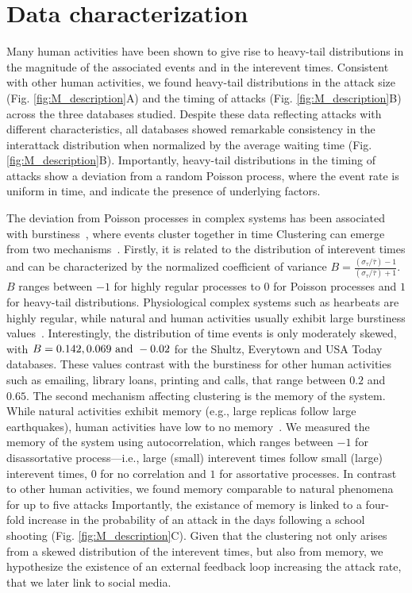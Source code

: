 \section*{Data characterization}
Many human activities have been shown to give rise to heavy-tail
distributions in the magnitude of the associated events and in the
interevent times.  Consistent with other human activities, we found
heavy-tail distributions in the attack size
(Fig. \ref{fig:M_description}A) and the timing of attacks
(Fig. \ref{fig:M_description}B) across the three databases studied.
Despite these data reflecting attacks with different characteristics,
all databases showed remarkable consistency in the interattack
distribution when normalized by the average waiting time
(Fig. \ref{fig:M_description}B).  Importantly, heavy-tail
distributions in the timing of attacks show a deviation from a random
Poisson process, where the event rate is uniform in time, and indicate
the presence of underlying factors.

The deviation from Poisson processes in complex systems has been
associated with burstiness~\cite{goh2008burstiness}, where events
cluster together in time
Clustering can emerge from two mechanisms~\cite{goh2008burstiness}.
Firstly, it is related to the distribution of interevent times and can
be characterized by the normalized coefficient of variance $B =
\frac{(\sigma_{\tau}/\bar{\tau}) - 1}{(\sigma_{\tau}/\bar{\tau}) +
  1}$.  $B$ ranges between $-1$ for highly regular processes to $0$
for Poisson processes and $1$ for heavy-tail distributions.
Physiological complex systems such as hearbeats are highly regular,
while natural and human activities usually exhibit large burstiness
values~\cite{goh2008burstiness}.  Interestingly, the distribution of
time events is only moderately skewed, with $B = 0.142, 0.069
\textnormal{ and } -0.02$ for the Shultz, Everytown and USA Today
databases. These values contrast with the burstiness for other human
activities such as emailing, library loans, printing and calls, that
range between $0.2$ and $0.65$.  The second mechanism affecting
clustering is the memory of the system.  While natural activities
exhibit memory (e.g., large replicas follow large earthquakes), human
activities have low to no memory~\cite{goh2008burstiness}.  We
measured the memory of the system using autocorrelation, which ranges
between $-1$ for disassortative process---i.e., large (small)
interevent times follow small (large) interevent times, $0$ for no
correlation and $1$ for assortative processes.  In contrast to other
human activities, we found memory comparable to natural phenomena for
up to five attacks
Importantly, the
existance of memory is linked to a four-fold increase in the
probability of an attack in the days following a school shooting
(Fig. \ref{fig:M_description}C).  Given that the clustering not only
arises from a skewed distribution of the interevent times, but also
from memory, we hypothesize the existence of an external feedback loop
increasing the attack rate, that we later link to social media.

